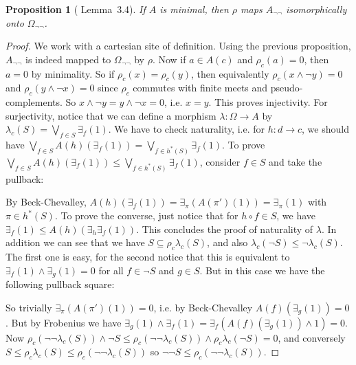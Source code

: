 \documentclass{article}
\newtheorem{proposition}[theorem]{Proposition}
\begin{document}
\begin{proposition}[\cite{harun1996applications} Lemma~3.4]\label{min_neg}
    If $A$ is minimal, then $\rho$ maps $A_{\neg\neg}$ isomorphically onto $\Omega_{\neg\neg}$.
\end{proposition}
\begin{proof}
    We work with a cartesian site of definition. Using the previous proposition, $A_{\neg\neg}$ is indeed mapped to $\Omega_{\neg\neg}$ by $\rho$. Now if $a\in A(c)$ and $\rho_c(a)=0$, then $a=0$ by minimality. So if $\rho_c(x)=\rho_c(y)$, then equivalently $\rho_c(x\land\neg y)=0$ and $\rho_c(y\land\neg x)=0$ since $\rho_c$ commutes with finite meets and pseudo-complements. So  $x\land\neg y=y\land\neg x=0$, i.e. $x=y$. This proves injectivity. For surjectivity, notice that we can define a morphism $\lambda:\Omega\xrightarrow{}A$ by $\lambda_c(S)=\bigvee_{f\in S}\exists_f(1)$. We have to check naturality, i.e. for $h:d\xrightarrow{}c$, we should have $\bigvee_{f\in S}A(h)(\exists_f(1))=\bigvee_{f\in h^*(S)}\exists_f(1)$. To prove $\bigvee_{f\in S}A(h)(\exists_f(1))\leq\bigvee_{f\in h^*(S)}\exists_f(1)$, consider $f\in S$ and take the pullback:
    \begin{center}
\end{center}
    By Beck-Chevalley, $A(h)(\exists_f(1))=\exists_\pi( A(\pi')(1))=\exists_\pi(1)$ with $\pi\in h^*(S)$. To prove the converse, just notice that for $h\circ f\in S$, we have $\exists_f(1)\leq A(h)(\exists_h\exists_f(1))$. This concludes the proof of naturality of $\lambda$. In addition we can see that we  have $S\subseteq\rho_c\lambda_c(S)$, and also $\lambda_c(\neg S)\leq \neg \lambda_c (S)$. The first one is easy, for the second notice that this is equivalent to $\exists_f(1)\land\exists_g(1)=0$ for all $f\in\neg S$ and $g\in S$. But in this case we have the following pullback square:
\begin{center}
\end{center}
So trivially $\exists_\pi(A(\pi')(1))=0$, i.e. by Beck-Chevalley $A(f)(\exists_g(1))=0$. But by Frobenius we have $\exists_g(1)\land\exists_f(1)=\exists_f(A(f)(\exists_g(1))\land 1)=0$.
    Now $\rho_c(\neg\neg\lambda_c(S))\land \neg S\leq\rho_c(\neg\neg\lambda_c(S))\land \rho_c\lambda_c(\neg S)=0$, and conversely $S\leq \rho_c\lambda_c(S)\leq \rho_c(\neg\neg\lambda_c(S))$ so $\neg\neg S\leq \rho_c(\neg\neg\lambda_c(S))$.
\end{proof}
\end{document}
